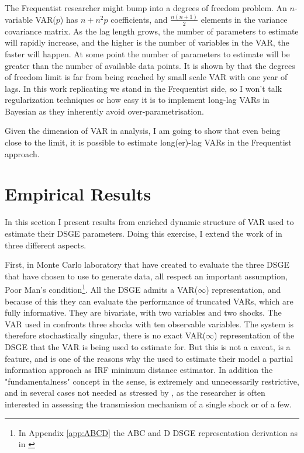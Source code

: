 \documentclass[12pt, a4paper]{article}
\begin{document}
The Frequentist researcher might bump into a degrees of freedom problem.
An $n$-variable VAR($p$) has $n + n^2p$ coefficients, and $\frac{n(n+1)}{2}$ elements in the variance 
covariance matrix. As the lag length grows, the number of parameters to estimate will rapidly increase, and the higher is 
the number of variables in the VAR, the faster will happen.
At some point the number of parameters to estimate will be greater than the number of available data points.
It is shown by \citet{Long_Lag2025} that the degrees of freedom limit is far from being reached by 
small scale VAR with one year of lags. In this work replicating \citet{ACEL2005WP} we stand in the Frequentist side,
so I won't talk regularization techniques or how easy it is to implement long-lag VARs in Bayesian as
they inherently avoid over-parametrisation.

Given the dimension of VAR in analysis, I am going to show that even being close to the limit, 
it is possible to estimate long(er)-lag VARs in the Frequentist approach.

\section{Empirical Results}
\label{sec:results}
In this section I present results from enriched dynamic structure of \citet{ACEL2005WP} VAR
used to estimate their DSGE parameters.
Doing this exercise, I extend the work of \citet{Long_Lag2025} in three different aspects.

First, in Monte Carlo laboratory that \citet{Long_Lag2025} have created to evaluate the three DSGE that have chosen 
to use to generate data, all respect an important assumption, \citet{FVRRSS2007} Poor Man's condition\footnote{In 
Appendix \ref{app:ABCD} the ABC and D DSGE representation derivation as in \citet{FVRRSS2007}}.
All the DSGE admits a VAR($\infty$) representation, and because of this they can evaluate the performance 
of truncated VARs, which are fully informative. They are bivariate, with two variables and two shocks.
The VAR used in \citet{ACEL2011} confronts three shocks with ten observable variables.
The system is therefore stochastically singular, there is no exact VAR($\infty$) representation of the DSGE that 
the VAR is being used to estimate for. But this is not a caveat, is a feature, and is one of the reasons why 
the \citet{ACEL2011} used to estimate their model a partial information approach as IRF minimum distance estimator.
In addition the "fundamentalness" concept in the \citet{Lippi_Reichlin1993,FVRRSS2007} sense, is extremely 
and unnecessarily restrictive, and in several cases not needed as stressed by \citet{Forni_Gambetti_Sala2016}, 
as the researcher is often interested in assessing the transmission mechanism of a single shock or of a few.
\\
\end{document}
